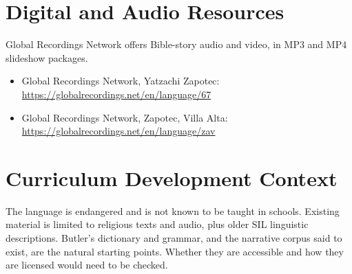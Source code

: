 \documentclass[12pt]{article}
\begin{document}
\section{Digital and Audio Resources}
Global Recordings Network offers Bible-story audio and video, in MP3 and MP4 slideshow packages.
\begin{itemize}
\item Global Recordings Network, Yatzachi Zapotec: \url{https://globalrecordings.net/en/language/67}
\item Global Recordings Network, Zapotec, Villa Alta: \url{https://globalrecordings.net/en/language/zav}
\end{itemize}

\section{Curriculum Development Context}
The language is endangered and is not known to be taught in schools. Existing material is limited to religious texts and audio, plus older SIL linguistic descriptions. Butler's dictionary and grammar, and the narrative corpus said to exist, are the natural starting points. Whether they are accessible and how they are licensed would need to be checked.
\end{document}
